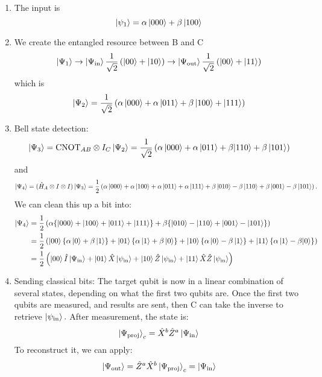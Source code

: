 \documentclass{article}
\numberwithin{equation}{section}
\begin{document}
\begin{enumerate}
    \item The input is
    \begin{equation}
        \ket{\psi_1} = \alpha\ket{000} + \beta\ket{100}
    \end{equation}
    \item We create the entangled resource between B and C
    \begin{equation}
        \ket{\Psi_1} \to \ket{\Psi_\text{in}} \frac{1}{\sqrt{2}}\left(\ket{00} + \ket{10}\right) \to \ket{\Psi_\text{out}}\frac{1}{\sqrt{2}}\left(\ket{00} + \ket{11}\right)
    \end{equation}
    which is
    \begin{equation}
        \ket{\Psi_2} = \frac{1}{\sqrt{2}}\left(\alpha\ket{000} + \alpha\ket{011} + \beta\ket{100} + \ket{111}\right)
    \end{equation}
    \item Bell state detection:
    \begin{equation}
        \ket{\Psi_3} = \text{CNOT}_{AB} \otimes I_C \ket{\Psi_2} = \frac{1}{\sqrt{2}}\left(\alpha\ket{000} + \alpha\ket{011}  + \beta{\ket{110}} + \beta\ket{101}\right)
    \end{equation}
    and
    \begin{equation}
        \ket{\Psi_4} = (\hat{H}_A \otimes I \otimes I)\ket{\Psi_3} = \frac{1}{2}\left(\alpha\ket{000} + \alpha\ket{100} + \alpha\ket{011} + \alpha\ket{111} + \beta\ket{010} - \beta\ket{110} + \beta\ket{001} - \beta\ket{101}\right).
    \end{equation}
    We can clean this up a bit into:
    \begin{align}
        \ket{\Psi_4} &= \frac{1}{2}\left(\alpha\{\ket{000} + \ket{100} +\ket{011} + \ket{111}\} + \beta\{\ket{010} - \ket{110} + \ket{001} - \ket{101}\}\right) \\ 
        &= \frac{1}{2} \left(\ket{00} \{\alpha\ket{0} + \beta\ket{1}\} + \ket{01}\{\alpha \ket{1} + \beta\ket{0}\} + \ket{10}\{\alpha\ket{0} - \beta\ket{1}\} + \ket{11}\{\alpha\ket{1} - \beta{\ket{0}}\}\right) \\ 
        &= \frac{1}{2}\left(\ket{00} \hat{I} \ket{\Psi_\text{in}} + \ket{01} \hat{X} \ket{\psi_\text{in}} + \ket{10}\hat{Z}\ket{\psi_\text{in}} + \ket{11} \hat{X}\hat{Z}\ket{\psi_\text{in}}\right)
    \end{align}
    \item Sending classical bits: The target qubit is now in a linear combination of several states, depending on what the first two qubits are. Once the first two qubits are measured, and results are sent, then C can take the inverse to retrieve $\ket{\psi_\text{in}}.$ After measurement, the state is:
    \begin{equation}
        \ket{\Psi_\text{proj}}_c = \hat{X}^b\hat{Z}^a\ket{\Psi_\text{in}}
    \end{equation}
    To reconstruct it, we can apply:
    \begin{equation}
        \ket{\Psi_\text{out}} = \hat{Z}^a\hat{X}^b\ket{\Psi_\text{proj}}_c = \ket{\Psi_\text{in}}
    \end{equation}
\end{enumerate}
\end{document}
